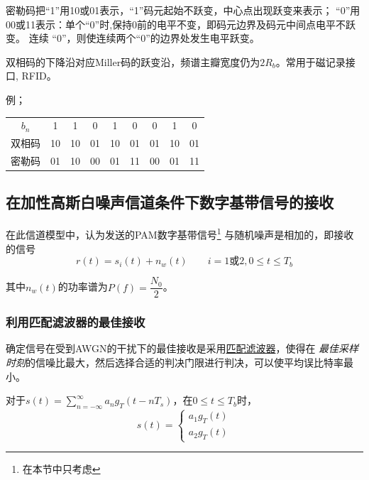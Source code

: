     密勒码把“1”用10或01表示，“1”码元起始不跃变，中心点出现跃变来表示；
    “0”用00或11表示：单个“0”时,保持0前的电平不变，即码元边界及码元中间点电平不跃变。
    连续 “0”，则使连续两个“0”的边界处发生电平跃变。

    双相码的下降沿对应Miller码的跃变沿，频谱主瓣宽度仍为$2R_b$。常用于磁记录接口, RFID。

    例；
    \begin{table}[H]
        \centering
        \begin{tabular}{c|*{8}{c}}
            \textcolor{bupt}{$b_n$} & 1 & 1 & 0 & 1 & 0 & 0 & 1 & 0 \\ \Xhline{0.3pt}
            \textcolor{bupt}{双相码} & 10 & 10 & 01 & 10 & 01 & 01 & 10 & 01 \\ \Xhline{0.3pt}
            \textcolor{bupt}{密勒码} & 01 & 10 & 00 & 01 & 11 & 00 & 01 & 11
        \end{tabular}
    \end{table}

\subsection[AWGN下的数字基带信号的接收]{在加性高斯白噪声信道条件下数字基带信号的接收}
    在此信道模型中，认为发送的PAM数字基带信号\footnote{在本节中只考虑}
    与随机噪声是相加的，即接收的信号
    \begin{equation*}
        r(t)=s_i(t)+n_w(t)\hspace{2em}i=1\text{或}2,0\leq t\leq T_b
    \end{equation*}

    其中$n_w(t)$的功率谱为$P(f)=\dfrac{N_0}{2}$。
    \subsubsection{利用匹配滤波器的最佳接收}

    确定信号在受到AWGN的干扰下的最佳接收是采用\hyperref[subsec:matched-filter]{匹配滤波器}，使得在
    \emph{最佳采样时刻}的信噪比最大，然后选择合适的判决门限进行判决，可以使平均误比特率最小。

    对于$s(t)=\displaystyle\sum_{n=-\infty}^{\infty}a_ng_T(t-nT_s)$，在$0\leq t\leq T_b$时，
    \vspace{-2ex}
    \begin{equation}
        s(t)=\begin{cases}
            a_1g_T(t)\\
            a_2g_T(t)
        \end{cases}
    \end{equation}

